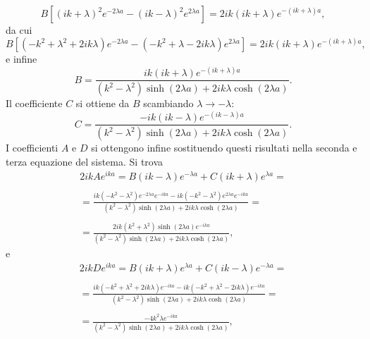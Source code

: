 \documentclass[a4paper,12pt,twoside]{book}
\begin{document}
\begin{equation}
B\left[ (ik+\lambda)^2 e^{-2\lambda a }-(ik-\lambda)^2 e^{2\lambda a }\right]= 2ik(ik+\lambda) e^{-\left(ik+\lambda\right) a },
\end{equation} 
da cui
\begin{equation}
B\left[ (-k^2+\lambda ^2+2ik\lambda) e^{-2\lambda a }-(-k^2+\lambda-2ik\lambda) e^{2\lambda a }\right]= 2ik(ik+\lambda) e^{-\left(ik+\lambda\right) a },
\end{equation}
e infine
\begin{equation}
B=\frac{ik\left(ik+\lambda \right)e^{-\left(ik+\lambda\right) a }}{\left(k^2-\lambda^2\right)\sinh \left(2\lambda a\right)+2ik\lambda \cosh\left(2\lambda a\right)}.
\end{equation}
Il coefficiente $C$ si ottiene da $B$ scambiando $\lambda \rightarrow -\lambda$:
\begin{equation}
C=\frac{-ik\left(ik-\lambda \right)e^{-\left(ik-\lambda\right) a }}{\left(k^2-\lambda^2\right)\sinh \left(2\lambda a\right)+2ik\lambda \cosh\left(2\lambda a\right)}.
\end{equation}
I coefficienti $A$ e $D$ si ottengono infine sostituendo questi risultati nella seconda e terza equazione del sistema. Si trova
\begin{eqnarray}
& 2ikAe^{ika}= B \left(ik-\lambda\right)e^{-\lambda a} +C \left(ik+\lambda\right)e^{\lambda a}=&\nonumber \\
\nonumber\\
& = \displaystyle{\frac{ik\left(-k^2-\lambda ^2 \right)e^{-2\lambda a }e^{-ika }-ik\left(-k^2-\lambda ^2 \right)e^{2\lambda a }e^{-ika }}{\left(k^2-\lambda^2\right)\sinh \left(2\lambda a\right)+2ik\lambda \cosh\left(2\lambda a\right)}=} &\nonumber \\
\nonumber \\
&\displaystyle{ =\frac{2ik\left(k^2+\lambda ^2 \right)\sinh\left(2\lambda a\right)e^{-ika}}{\left(k^2-\lambda^2\right)\sinh \left(2\lambda a\right)+2ik\lambda \cosh\left(2\lambda a\right)}},&
\end{eqnarray}
e
\begin{eqnarray}
&2ikD e^{ika} = B\left(ik+\lambda\right)e^{\lambda a} + C\left(ik-\lambda\right)e^{-\lambda a} = &\nonumber \\
\nonumber\\
& = \displaystyle{\frac{ik\left(-k^2 + \lambda ^2 +2ik\lambda\right)e^{-ika}-ik\left(-k^2 + \lambda ^2 -2ik\lambda\right)e^{-ika}}{\left(k^2-\lambda^2\right)\sinh \left(2\lambda a\right)+2ik\lambda \cosh\left(2\lambda a\right)}=} &\nonumber \\
\nonumber \\
&\displaystyle{ =\frac{-4k^2\lambda e^{-ika}}{\left(k^2-\lambda^2\right)\sinh \left(2\lambda a\right)+2ik\lambda \cosh\left(2\lambda a\right)}},&
\end{eqnarray}
\end{document}
